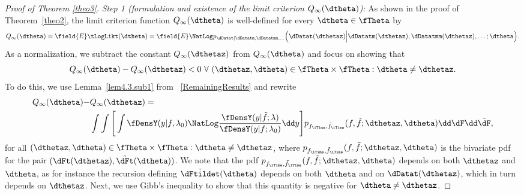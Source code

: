 \begin{proof}[Proof of Theorem \ref{theo3}]
\smallskip
\textit{Step 1 (formulation and existence of the limit criterion $Q_{\infty}(\dtheta)$):}
As shown in the proof of Theorem~\ref{theo2}, the limit criterion function $Q_{\infty}(\dtheta)$ is well-defined for every $\dtheta\in\fTheta$ by
\begin{equation*}
Q_{\infty}(\dtheta)=\field{E}\tLogLikt(\dtheta)=\field{E}\NatLog p_{\dDatat|\dDatatm,\dDatatmm,\ldots}\Big(\dDatat(\dthetaz)\Big| \dDatatm(\dthetaz), \dDatatmm(\dthetaz), \ldots;\dtheta\Big).
\end{equation*} 
As a normalization, we subtract the constant
$
Q_{\infty}(\dthetaz)%
$
from $Q_{\infty}(\dtheta)$ 
and focus on showing that
\[
Q_{\infty}(\dtheta) - Q_{\infty}(\dthetaz)<0 \ \forall \ (\dthetaz,\dtheta) \in \fTheta \times \fTheta : \dtheta \neq \dthetaz  .
\]
To do this, we use Lemma~\ref{lem4.3.sub1} from \SupplementaryAppendix\ \ref{RemainingResults} and rewrite
\begin{align}
	\notag
            Q_{\infty} (\dtheta) - &Q_{\infty}(\dthetaz) =
	\\
	&
            \int \int \Bigg[ \int \fDensY(y|f,\lambda_{0})  \NatLog\frac{ \fDensY(y|  \tilde{f};\lambda) }{\fDensY(y|f;\lambda_{0} )}  \dd y \Bigg] p_{f_{\iTime},\tilde{f}_{\iTime}}(f,\tilde{f};\dthetaz,\dtheta)
            \dd \dF \dd \tilde{\dF},
	\label{identification1}
\end{align}
for all $(\dthetaz,\dtheta) \in \fTheta \times \fTheta : \dtheta \neq \dthetaz$,
where $p_{f_{\iTime},\tilde{f}_{\iTime}}(f,\tilde{f};\dthetaz,\dtheta)$ is the bivariate pdf for the pair $(\dFt(\dthetaz), \tilde\dFt(\dtheta))$.
We note that the pdf  
$p_{f_{\iTime},\tilde{f}_{\iTime}}(f,\tilde{f};\dthetaz,\dtheta)$
depends on both $\dthetaz$ and $\dtheta$, as for instance the recursion defining $\tilde\dFtildet(\dtheta)$ depends on both $\dtheta$ and on $\dDatat(\dthetaz)$, which in turn depends on $\dthetaz$.
Next, we use Gibb's inequality to show that this quantity is negative for $\dtheta\not=\dthetaz$.




\end{proof}
